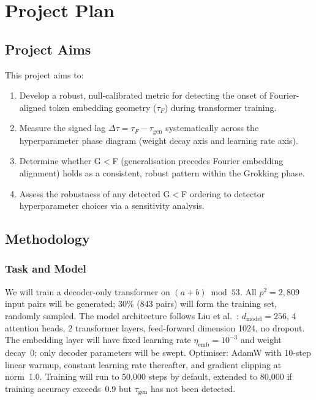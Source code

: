\documentclass[12pt,openany,a4paper]{book}
\newcommand{\taug}{\tau_{\mathrm{gen}}}
\newcommand{\tauf}{\tau_{F}}
\newcommand{\Dtau}{\Delta\tau}
\begin{document}
\chapter{Project Plan}
\label{chap:plan}

\section{Project Aims}

This project aims to:
\begin{enumerate}
  \item Develop a robust, null-calibrated metric for detecting the
    onset of Fourier-aligned token embedding geometry ($\tauf$) during
    transformer training.
  \item Measure the signed lag $\Dtau = \tauf - \taug$ systematically
    across the hyperparameter phase diagram (weight decay axis and
    learning rate axis).
  \item Determine whether G$<$F (generalisation precedes Fourier
    embedding alignment) holds as a consistent, robust pattern within
    the Grokking phase.
  \item Assess the robustness of any detected G$<$F ordering to
    detector hyperparameter choices via a sensitivity analysis.
\end{enumerate}

\section{Methodology}

\subsection{Task and Model}

We will train a decoder-only transformer \cite{vaswani2017attention}
on $(a+b)\bmod 53$.
All $p^2 = 2{,}809$ input pairs will be generated; 30\% (843 pairs)
will form the training set, randomly sampled.
The model architecture follows Liu et al.\ \cite{liu2022towards}:
$d_{\mathrm{model}}=256$, 4 attention heads, 2 transformer layers,
feed-forward dimension 1024, no dropout.
The embedding layer will have fixed learning rate $\eta_{\mathrm{emb}}
= 10^{-3}$ and weight decay~0; only decoder parameters will be swept.
Optimiser: AdamW with 10-step linear warmup, constant learning rate
thereafter, and gradient clipping at norm~1.0.
Training will run to 50{,}000 steps by default, extended to 80{,}000
if training accuracy exceeds~0.9 but $\taug$ has not been detected.
\end{document}
